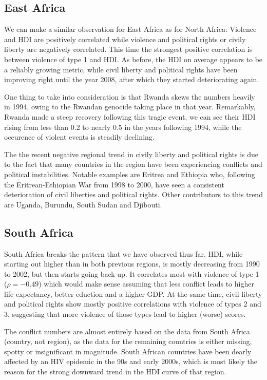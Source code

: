 \documentclass[a4paper,11pt]{article}
\begin{document}
\subsection{East Africa}
We can make a similar observation for East Africa as for North Africa: Violence and HDI are positively correlated while violence and political rights or civily liberty are negatively correlated. This time the strongest positive correlation is between violence of type 1 and HDI\@. As before, the HDI on average appears to be a reliably growing metric, while civil liberty and political rights have been improving right until the year 2008, after which they started deteriorating again.

One thing to take into consideration is that Rwanda skews the numbers heavily in 1994, owing to the Rwandan genocide taking place in that year. Remarkably, Rwanda made a steep recovery following this tragic event, we can see their HDI rising from less than 0.2 to nearly 0.5 in the years following 1994, while the occurence of violent events is steadily declining.

The the recent negative regional trend in civily liberty and political rights is due to the fact that many countries in the region have been experiencing conflicts and political instabilities. Notable examples are Eritrea and Ethiopia who, following the Eritrean-Ethiopian War from 1998 to 2000, have seen a consistent deterioration of civil liberties and political rights. Other contributors to this trend are Uganda, Burundu, South Sudan and Djibouti.

\subsection{South Africa}

South Africa breaks the pattern that we have observed thus far. HDI, while starting out higher than in both previous regions, is mostly decreasing from 1990 to 2002, but then starts going back up. It correlates most with violence of type 1 ($\rho = -0.49$) which would make sense assuming that less conflict leads to higher life expectancy, better eduction and a higher GDP\@. At the same time, civil liberty and political rights show mostly positive correlations with violence of types 2 and 3, suggesting that more violence of those types lead to higher (worse) scores.

The conflict numbers are almost entirely based on the data from South Africa (country, not region), as the data for the remaining countries is either missing, spotty or insignificant in magnitude. South African countries have been dearly affected by an HIV epidemic in the 90s and early 2000s, which is most likely the reason for the strong downward trend in the HDI curve of that region.
\end{document}
